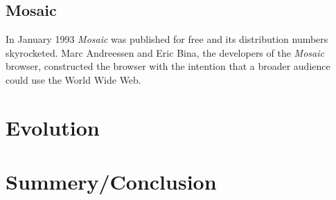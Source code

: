 \documentclass[runningheads]{llncs}
\begin{document}
\subsection{Mosaic}
In January 1993 \textit{Mosaic} was published for free and its distribution numbers skyrocketed. Marc Andreessen and Eric Bina, the developers of the \textit{Mosaic} browser, constructed the browser with the intention that a broader audience could use the World Wide Web. 
\section{Evolution}

\section{Summery/Conclusion}
\end{document}
